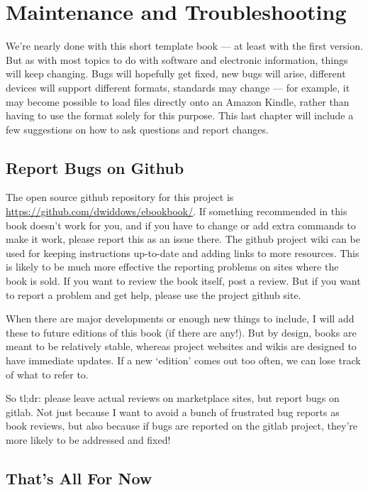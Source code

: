 \chapter{Maintenance and Troubleshooting}

We're nearly done with this short template book --- at least with the first version.
But as with most topics to do with software and electronic information, things will keep changing.
Bugs will hopefully get fixed, new bugs will arise, different devices will support different formats,
standards may change --- for example, it may become
possible to load  files directly onto an Amazon Kindle, rather than having to use the
 format solely for this purpose. This last chapter will include a few suggestions on how
to ask questions and report changes.

\section{Report Bugs on Github}

The open source github repository for this project is {\small \url{https://github.com/dwiddows/ebookbook/}}.
If something recommended in this book doesn't work for you, and if you have to change or add extra
commands to make it work, please report this as an issue there. The github project wiki can be used for
keeping instructions up-to-date and adding links to more resources. This is likely to be much more effective
the reporting problems on sites where the book is sold.
If you want to review the book itself, post a review. But if you want to report a problem and get
help, please use the project github site.

When there are major developments or enough new things to include, I will add these to future
editions of this book (if there are any!). But by design, books are meant to be relatively stable, whereas
project websites and wikis are designed to have immediate updates. If a new `edition' comes out too often,
we can lose track of what to refer to.

So tl;dr: please leave actual reviews on marketplace sites, but report bugs on gitlab. Not just because
I want to avoid a bunch of frustrated bug reports as book reviews, but also because if
bugs are reported on the gitlab project, they're more likely to be addressed and fixed!

\section{That's All For Now}


